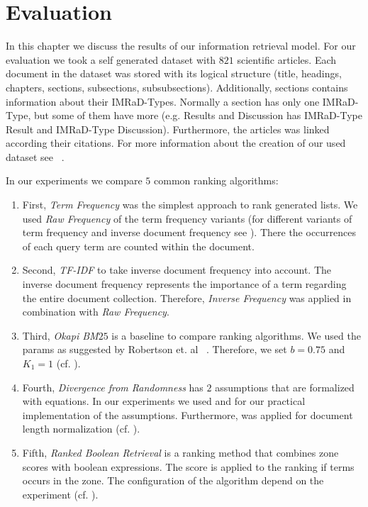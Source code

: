 \chapter{Evaluation}
\label{cha:evaluation}

In this chapter we discuss the results of our information retrieval model. For our evaluation we took a self generated dataset with $821$ scientific articles. Each document in the dataset was stored with its logical structure (title, headings, chapters, sections, subsections, subsubsections). Additionally, sections contains information about their IMRaD-Types. Normally a section has only one IMRaD-Type, but some of them have more (e.g. Results and Discussion has IMRaD-Type Result and IMRaD-Type Discussion). Furthermore, the articles was linked according their citations. For more information about the creation of our used dataset see ~.

In our experiments we compare $5$ common ranking algorithms:
\begin{enumerate}
  \item First, \textit{Term Frequency} was the simplest approach to rank generated lists. We used \textit{Raw Frequency} of the term frequency variants (for different variants of term frequency and inverse document frequency see ). There the occurrences of each query term are counted within the document.
  \item Second, \textit{TF-IDF} to take inverse document frequency into account. The inverse document frequency represents the importance of a term regarding the entire document collection. Therefore, \textit{Inverse Frequency} was applied in combination with \textit{Raw Frequency}.
  \item Third, \textit{Okapi BM$25$} is a baseline to compare ranking algorithms. We used the params as suggested by Robertson et. al ~\cite{RobertsonWJHG94}. Therefore, we set $b=0.75$ and $K_1 = 1$ (cf. ).
  \item Fourth, \textit{Divergence from Randomness} has $2$ assumptions that are formalized with equations. In our experiments we used  and  for our practical implementation of the assumptions. Furthermore,  was applied for document length normalization (cf. ). 
  \item Fifth, \textit{Ranked Boolean Retrieval} is a ranking method that combines zone scores with boolean expressions. The score is applied to the ranking if terms occurs in the zone. The configuration of the algorithm depend on the experiment (cf. ).
\end{enumerate}

